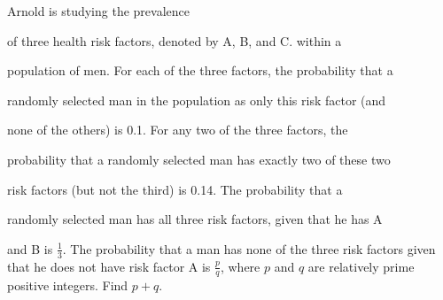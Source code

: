 Arnold is studying the prevalence

 of three health risk factors, denoted by A, B, and C. within a 

population of men. For each of the three factors, the probability that a

 randomly selected man in the population as only this risk factor (and 

none of the others) is 0.1. For any two of the three factors, the 

probability that a randomly selected man has exactly two of these two 

risk factors (but not the third) is 0.14. The probability that a 

randomly selected man has all three risk factors, given that he has A 

and B is $\tfrac{1}{3}$. The probability that a man has none of the three risk factors given that he does not have risk factor A is $\tfrac{p}{q}$,  where $p$ and $q$ are relatively prime positive integers. Find $p+q$.